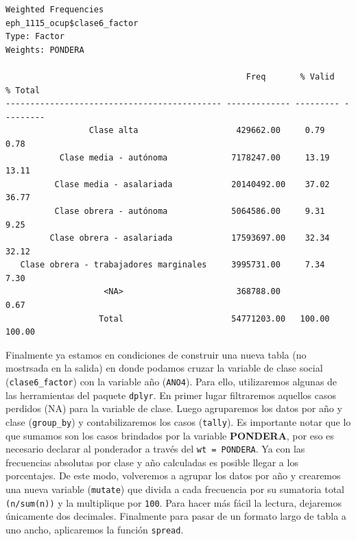 \documentclass[
]{article}
\begin{document}
\begin{verbatim}
Weighted Frequencies  
eph_1115_ocup$clase6_factor  
Type: Factor  
Weights: PONDERA  

                                                 Freq       % Valid   % Total 
-------------------------------------------- ------------- --------- ---------
                 Clase alta                    429662.00     0.79      0.78   
           Clase media - autónoma             7178247.00     13.19     13.11  
          Clase media - asalariada            20140492.00    37.02     36.77  
          Clase obrera - autónoma             5064586.00     9.31      9.25   
         Clase obrera - asalariada            17593697.00    32.34     32.12  
   Clase obrera - trabajadores marginales     3995731.00     7.34      7.30   
                    <NA>                       368788.00               0.67   
                   Total                      54771203.00   100.00    100.00  
\end{verbatim}

Finalmente ya estamos en condiciones de construir una nueva tabla (no mostrsada en la salida) en donde podamos cruzar la variable de clase social (\texttt{clase6\_factor}) con la variable año (\texttt{ANO4}). Para ello, utilizaremos algunas de las herramientas del paquete \texttt{dplyr}. En primer lugar filtraremos aquellos casos perdidos (NA) para la variable de clase. Luego agruparemos los datos por año y clase (\texttt{group\_by}) y contabilizaremos los casos (\texttt{tally}). Es importante notar que lo que sumamos son los casos brindados por la variable \textbf{PONDERA}, por eso es necesario declarar al ponderador a través del \texttt{wt\ =\ PONDERA}. Ya con las frecuencias absolutas por clase y año calculadas es posible llegar a los porcentajes. De este modo, volveremos a agrupar los datos por año y crearemos una nueva variable (\texttt{mutate}) que divida a cada frecuencia por su sumatoria total \texttt{(n/sum(n))} y la multiplique por \texttt{100}. Para hacer más fácil la lectura, dejaremos únicamente dos decimales. Finalmente para pasar de un formato largo de tabla a uno ancho, aplicaremos la función \texttt{spread}.
\end{document}
